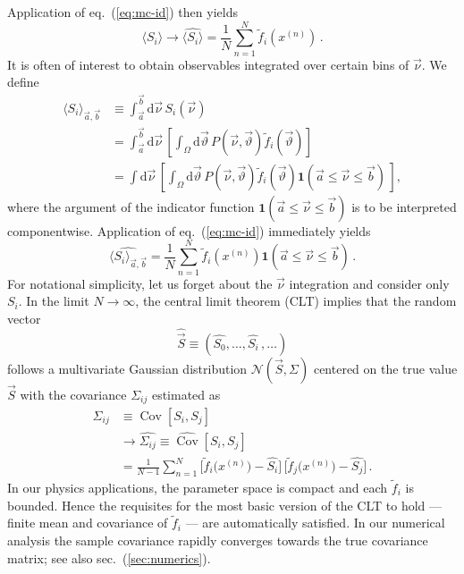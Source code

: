 \documentclass[aps,nofootinbib,preprintnumbers,prd,twocolumn]{revtex4-1}
\newcommand{\dual}[1]{\tilde{#1}}
\newcommand{\est}[1]{\widehat{#1}}
\newcommand{\nuvec}{\vec{\nu}}
\newcommand{\refeq}[1]{eq.~(\ref{eq:#1})}
\newcommand{\refsec}[1]{sec.~(\ref{sec:#1})}
\newcommand{\rmdx}[1]{\mbox{d} #1 \,} %
\newcommand{\thvec}{\vec{\vartheta}}
\renewcommand{\theta}{\vartheta}
\newcommand{\vecest}[1]{\widehat{\vec{#1}}}
\DeclareMathOperator{\cov}{Cov}
\begin{document}
Application of \refeq{mc-id} then yields
\begin{equation}
    \langle S_i\rangle \to \widehat{\langle S_i\rangle} = \frac{1}{N} \sum_{n=1}^{N} \dual{f}_i(x^{(n)})\,.
\end{equation}
It is often of interest to obtain observables integrated over certain
bins of $\nuvec$. We define
\begin{align}
    \langle S_i\rangle_{\vec{a},\vec{b}}
    & \equiv \int_{\vec{a}}^{\vec{b}} \rmdx{\nuvec} S_i(\nuvec)\\
    & = \int_{\vec{a}}^{\vec{b}} \rmdx{\nuvec} \left[\int_{\Omega} \rmdx{\vec\theta} P(\nuvec,\thvec) \dual{f}_i(\thvec)  \right]\\
    & = \int \rmdx{\nuvec} \left[\int_{\Omega} \rmdx{\vec\theta}  P(\nuvec,\thvec) \dual{f}_i(\thvec)
        \mathbf{1}(\vec{a} \le \nuvec \le \vec{b})\,
        \right],
\end{align}
where the argument of the indicator function $ \mathbf{1}(\vec{a} \le
\nuvec \le \vec{b})$ is to be interpreted componentwise.
Application of \refeq{mc-id} immediately yields
\begin{equation}
    \label{eq:bin-importance}
    \widehat{\langle S_i\rangle_{\vec{a},\vec{b}}}
    = \frac{1}{N} \sum_{n=1}^{N} \dual{f}_i(x^{(n)})         \mathbf{1}(\vec{a} \le \nuvec \le \vec{b})\,.
\end{equation}
For notational simplicity, let us forget about the $\nuvec$
integration and consider only $S_i$. In the limit $N \to \infty$, the
central limit theorem (CLT) implies that the random vector
\begin{equation}
  \label{eq:angular-obs-vec}
  \vecest{S} \equiv (\est{S_0}, \dots, \est{S_i}\,,
  \dots)
\end{equation}
follows a multivariate Gaussian distribution $\mathcal{N}(\vec{S},
\Sigma)$ centered on the true value $\vec{S}$ with the
covariance $\Sigma_{ij}$ estimated as
\begin{equation}
\begin{aligned}
    \Sigma_{ij}
        & \equiv \cov[S_i,S_j]\\
        & \to \est{\Sigma_{ij}} \equiv \est{\cov}[{S}_i, {S}_j]\\
        & = \frac{1}{N - 1} \sum_{n=1}^{N} \Big[\dual{f}_i\big(x^{(n)}\big) - \est{S_i}\Big]\,\Big[\dual{f}_j\big(x^{(n)}\big) - \widehat{S_j}\Big]\,.
\end{aligned}
\end{equation}
In our physics applications, the parameter space is compact and each
$\dual{f}_i$ is bounded. Hence the requisites for the most basic
version of the CLT to hold --- finite mean and covariance of
$\dual{f}_i$ --- are automatically satisfied.
In our numerical analysis the sample covariance rapidly converges towards the true covariance
matrix; see also \refsec{numerics}.\\
\end{document}
